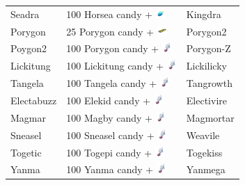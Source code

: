 \begin{table}
\begin{tabular}{lll}
    Seadra & 100 Horsea candy + \includegraphics[width=1em,height=1em]{images/dragonscale.png} & Kingdra \\
    Porygon & 25 Porygon candy + \includegraphics[width=1em,height=1em]{images/upgrade.png} & Porygon2 \\
    Poygon2 & 100 Porygon candy + \includegraphics[width=1em,height=1em]{images/sinnohstone.png} & Porygon-Z \\
    Lickitung & 100 Lickitung candy + \includegraphics[width=1em,height=1em]{images/sinnohstone.png} & Lickilicky \\
    Tangela	& 100 Tangela candy + \includegraphics[width=1em,height=1em]{images/sinnohstone.png} & Tangrowth \\
    Electabuzz & 100 Elekid candy + \includegraphics[width=1em,height=1em]{images/sinnohstone.png} & Electivire	\\
    Magmar & 100 Magby candy + \includegraphics[width=1em,height=1em]{images/sinnohstone.png} & Magmortar	\\
    Sneasel & 100 Sneasel candy + \includegraphics[width=1em,height=1em]{images/sinnohstone.png} & Weavile	\\
    Togetic & 100 Togepi candy + \includegraphics[width=1em,height=1em]{images/sinnohstone.png} & Togekiss	\\
    Yanma & 100 Yanma candy + \includegraphics[width=1em,height=1em]{images/sinnohstone.png} & Yanmega	\\

\end{tabular}
\end{table}

